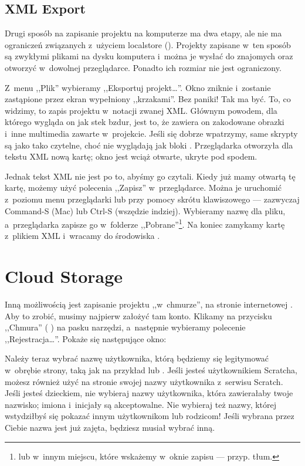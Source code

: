 \documentclass[a4paper]{report}
\begin{document}
{\Huge \TODO{}}

\subsection{XML Export}

Drugi sposób na zapisanie projektu na komputerze ma dwa etapy, ale nie ma ograniczeń związanych z~użyciem localstore (). Projekty zapisane w~ten sposób są zwykłymi plikami na dysku komputera i~można je wysłać do znajomych oraz otworzyć w~dowolnej przeglądarce. Ponadto ich rozmiar nie jest ograniczony.

Z~menu ,,Plik''  wybieramy ,,Eksportuj projekt\ldots''. Okno  zniknie i~zostanie zastąpione przez ekran wypełniony ,,krzakami''. Bez paniki! Tak ma być. To, co widzimy, to zapis projektu w~notacji zwanej XML. Głównym powodem, dla którego wygląda on jak stek bzdur, jest to, że zawiera on zakodowane obrazki i~inne multimedia zawarte w~projekcie. Jeśli się dobrze wpatrzymy, same skrypty są jako tako czytelne, choć nie wyglądają jak bloki . Przeglądarka otworzyła dla tekstu XML nową kartę; okno  jest wciąż otwarte, ukryte pod spodem.

Jednak tekst XML nie jest po to, abyśmy go czytali. Kiedy już mamy otwartą tę kartę, możemy użyć polecenia ,,Zapisz'' w~przeglądarce. Można je uruchomić z~poziomu menu przeglądarki lub przy pomocy skrótu klawiszowego --- zazwyczaj Command-S (Mac) lub Ctrl-S (wszędzie indziej). Wybieramy nazwę dla pliku, a~przeglądarka zapisze go w~folderze ,,Pobrane''\footnote{lub w~innym miejscu, które wskażemy w~oknie zapisu --- przyp. tłum.}. Na koniec zamykamy kartę z~plikiem XML i~wracamy do środowiska \Snap{}.

\section{Cloud Storage}

Inną możliwością jest zapisanie projektu ,,w~chmurze'', na stronie internetowej . Aby to zrobić, musimy najpierw założyć tam konto. Klikamy na przycisku ,,Chmura'' (\,\,) na pasku narzędzi, a~następnie wybieramy polecenie ,,Rejestracja\ldots''. Pokaże się następujące okno:\nopagebreak


Należy teraz wybrać nazwę użytkownika, którą będziemy się legitymować w~obrębie strony, taką jak na przykład  lub . Jeśli jesteś użytkownikiem Scratcha, możesz również użyć na stronie  swojej nazwy użytkownika z~serwisu Scratch. Jeśli jesteś dzieckiem, nie wybieraj nazwy użytkownika, która zawierałaby twoje nazwisko; imiona i~inicjały są akceptowalne. Nie wybieraj też nazwy, której wstydziłbyś się pokazać innym użytkownikom lub rodzicom! Jeśli wybrana przez Ciebie nazwa jest już zajęta, będziesz musiał wybrać inną.
\end{document}
